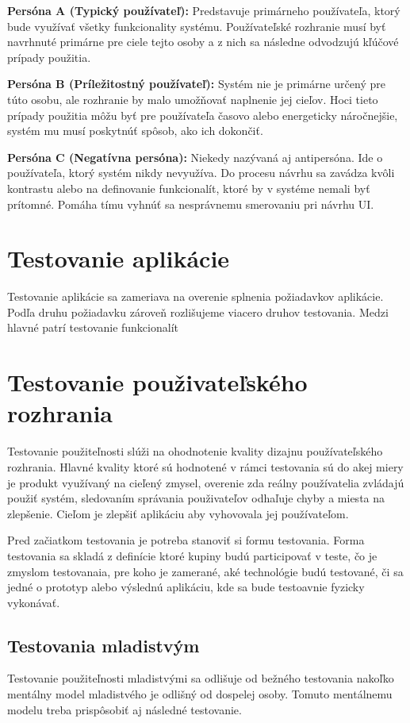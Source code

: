 \textbf{Persóna A (Typický používateľ):} Predstavuje primárneho používateľa, ktorý bude využívať všetky funkcionality systému. Používateľské rozhranie musí byť navrhnuté primárne pre ciele tejto osoby a z nich sa následne odvodzujú kľúčové prípady použitia.

\textbf{Persóna B (Príležitostný používateľ):} Systém nie je primárne určený pre túto osobu, ale rozhranie by malo umožňovať naplnenie jej cieľov. Hoci tieto prípady použitia môžu byť pre používateľa časovo alebo energeticky náročnejšie, systém mu musí poskytnúť spôsob, ako ich dokončiť.

\textbf{Persóna C (Negatívna persóna):} Niekedy nazývaná aj antipersóna. Ide o používateľa, ktorý systém nikdy nevyužíva. Do procesu návrhu sa zavádza kvôli kontrastu alebo na definovanie funkcionalít, ktoré by v systéme nemali byť prítomné. Pomáha tímu vyhnúť sa nesprávnemu smerovaniu pri návrhu UI.
\cite{usability_testing}


\section{Testovanie aplikácie}
Testovanie aplikácie sa zameriava na overenie splnenia požiadavkov aplikácie. Podľa druhu požiadavku zároveň rozlišujeme viacero druhov testovania. Medzi hlavné patrí testovanie funkcionalít


\section{Testovanie použivateľského rozhrania}
Testovanie použiteľnosti slúži na ohodnotenie kvality dizajnu používateľského rozhrania. Hlavné kvality ktoré sú hodnotené v rámci testovania sú do akej miery je produkt využívaný na cieľený zmysel, overenie zda reálny používatelia zvládajú použiť systém, sledovaním správania použivateľov odhaľuje chyby a miesta na zlepšenie. Cieľom je zlepšiť aplikáciu aby vyhovovala jej používateľom.

Pred začiatkom testovania je potreba stanoviť si formu testovania. Forma testovania sa skladá z definície ktoré kupiny budú participovať v teste, čo je zmyslom testovanaia, pre koho je zamerané, aké technológie budú testované, či sa jedné o prototyp alebo výslednú aplikáciu, kde sa bude testoavnie fyzicky vykonávať.\cite{usability_testing}


\subsection{Testovania mladistvým}
Testovanie použiteľnosti mladistvými sa odlišuje od bežného testovania nakoľko mentálny model mladistvého je odlišný od dospelej osoby. Tomuto mentálnemu modelu treba prispôsobiť aj následné testovanie.

